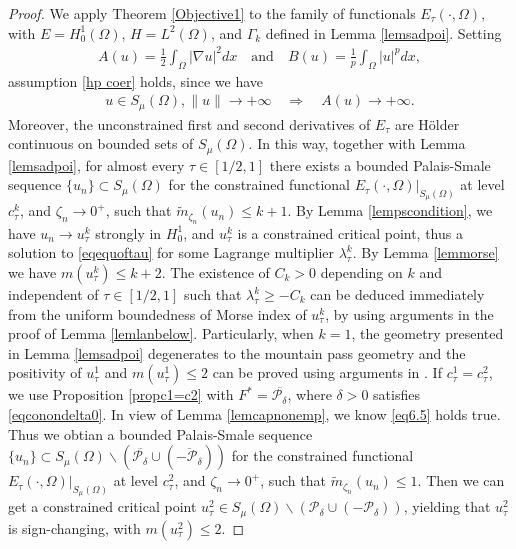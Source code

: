\documentclass[10pt,a4paper]{article}
\theoremstyle{definition} \theoremstyle{remark}
\numberwithin{equation}{section}
\newcommand{\p}{\mathcal{P}}
\newcommand{\la}{\lambda}
\begin{document}
\begin{proof}
    We apply Theorem \ref{Objective1} to the family of functionals $E_\tau(\cdot,\Omega)$, with $E = H_0^1(\Omega)$, $H = L^2(\Omega)$, and $\Gamma_k$ defined in Lemma \ref{lemsadpoi}. Setting
	\begin{align*}
		A(u) = \frac12 \int_\Omega|\nabla u|^2dx \quad \text{and} \quad B(u) = \frac1p\int_\Omega|u|^pdx,
	\end{align*}
    assumption \eqref{hp coer} holds, since we have
    \begin{align*}
    	u \in S_\mu(\Omega), \|u\| \to +\infty \quad \Rightarrow \quad A(u) \to +\infty.
    \end{align*}
    Moreover, the unconstrained first and second derivatives of $E_\tau$ are H\"older continuous on bounded sets of $S_\mu(\Omega)$. In this way, together with Lemma \ref{lemsadpoi}, for almost every $\tau \in [1/2,1]$ there exists a bounded Palais-Smale sequence $\{u_n\} \subset S_\mu(\Omega)$ for the constrained functional $E_\tau(\cdot,\Omega)|_{S_\mu(\Omega)}$ at level $c_\tau^k$, and $\zeta_n \to 0^+$, such that $\tilde m_{\zeta_n}(u_n) \leq k+1$. By Lemma \ref{lempscondition}, we have $u_n \to u_\tau^k$ strongly in $H_0^1$, and $u_\tau^k$ is a constrained critical point, thus a solution to \eqref{eqequoftau} for some Lagrange multiplier $\la_\tau^k$. By Lemma \ref{lemmorse} we have $m(u_\tau^k) \leq k+2$. The existence of $C_k > 0$ depending on $k$ and independent of $\tau \in [1/2,1]$ such that $\la_\tau^k \geq -C_k$ can be deduced immediately from the uniform boundedness of Morse index of $u_\tau^k$, by using arguments in the proof of Lemma \ref{lemlanbelow}. Particularly, when $k = 1$, the geometry presented in Lemma \ref{lemsadpoi} degenerates to the mountain pass geometry and the positivity of $u_\tau^1$ and $m(u_\tau^1) \leq 2$ can be proved using arguments in \cite{CJS}. If $c_\tau^1 = c_\tau^2$, we use Proposition \ref{propc1=c2} with $F^* = \overline{\p_\delta}$, where $\delta > 0$ satisfies \eqref{eqconondelta0}. In view of Lemma \ref{lemcapnonemp}, we know \eqref{eq6.5} holds true. Thus we obtian a bounded Palais-Smale sequence $\{u_n\} \subset S_\mu(\Omega) \backslash (\overline{\p_\delta} \cup (\overline{-\p_\delta}))$ for the constrained functional $E_\tau(\cdot,\Omega)|_{S_\mu(\Omega)}$ at level $c_\tau^2$, and $\zeta_n \to 0^+$, such that $\tilde m_{\zeta_n}(u_n) \leq 1$. Then we can get a constrained critical point $u_\tau^2 \in S_\mu(\Omega) \backslash (\p_\delta \cup (-\p_\delta))$, yielding that $u_\tau^2$ is sign-changing, with $m(u_\tau^2) \leq 2$.


\end{proof}
\end{document}
